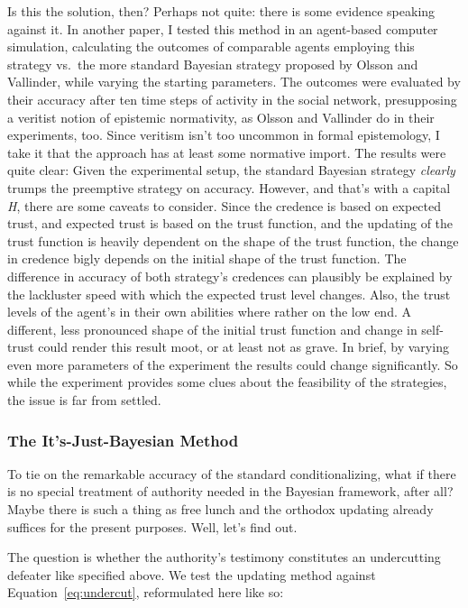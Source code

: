 \documentclass[11pt, a4paper]{scrartcl}
\renewcommand{\i}[1]{\emph{#1}}
\begin{document}
Is this the solution, then? Perhaps not quite: there is some evidence speaking against it. In another paper, I tested this method in an agent-based computer simulation, calculating the outcomes of comparable agents employing this strategy vs.\ the more standard Bayesian strategy proposed by Olsson and Vallinder, while varying the starting parameters. The outcomes were evaluated by their accuracy after ten time steps of activity in the social network, presupposing a veritist notion of epistemic normativity, as Olsson and Vallinder do in their experiments, too. Since veritism isn't too uncommon in formal epistemology, I take it that the approach has at least some normative import. The results were quite clear: Given the experimental setup, the standard Bayesian strategy \i{clearly} trumps the preemptive strategy on accuracy. However, and that's with a capital \i{H}, there are some caveats to consider. Since the credence is based on expected trust, and expected trust is based on the trust function, and the updating of the trust function is heavily dependent on the shape of the trust function, the change in credence bigly depends on the initial shape of the trust function. The difference in accuracy of both strategy's credences can plausibly be explained by the lackluster speed with which the expected trust level changes. Also, the trust levels of the agent's in their own abilities where rather on the low end. A different, less pronounced shape of the initial trust function and change in self-trust could render this result moot, or at least not as grave. In brief, by varying even more parameters of the experiment the results could change significantly. So while the experiment provides some clues about the feasibility of the strategies, the issue is far from settled. 

\subsubsection{The It's-Just-Bayesian Method}

To tie on the remarkable accuracy of the standard conditionalizing, what if there is no special treatment of authority needed in the Bayesian framework, after all? Maybe there is such a thing as free lunch and the orthodox updating already suffices for the present purposes. Well, let's find out. 

The question is whether the authority's testimony constitutes an undercutting defeater like specified above. We test the updating method against Equation~\ref{eq:undercut}, reformulated here like so:
\end{document}
